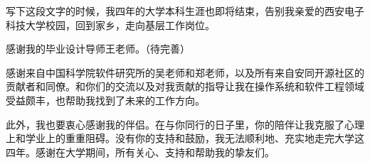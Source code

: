 \begin{thanksfor}
写下这段文字的时候，我四年的大学本科生涯也即将结束，告别我亲爱的西安电子科技大学校园，回到家乡，走向基层工作岗位。

感谢我的毕业设计导师王老师。（待完善）%

感谢来自中国科学院软件研究所的吴老师和郑老师，以及所有来自安同开源社区的贡献者和同僚。和你们的交流以及对我贡献的指导让我在操作系统和软件工程领域受益颇丰，也帮助我找到了未来的工作方向。

此外，我也要衷心感谢我的伴侣。在与你同行的日子里，你的陪伴让我克服了心理上和学业上的重重阻碍。没有你的支持和鼓励，我无法顺利地、充实地走完大学这四年。感谢在大学期间，所有关心、支持和帮助我的挚友们。
\end{thanksfor}
